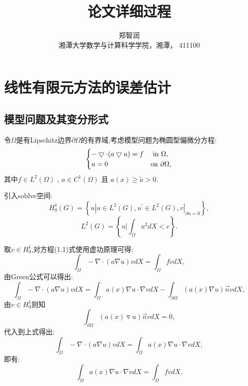 \documentclass[9pt, a4paper,eqno]{article}
\theoremstyle{plain}
\begin{document}
\begin{CJK}{UTF8}{gkai}
\title{\LARGE
论文详细过程 
 }


\author {郑智润  \\
\small{湘潭大学数学与计算科学学院，湘潭， 411100 }  \\
}


\date{}

\maketitle \thispagestyle{empty} \large{
}

\section{线性有限元方法的误差估计}
\subsection{模型问题及其变分形式}
\noindent


令$\Omega$是有Lipschitz边界$\partial\Omega$的有界域,考虑模型问题为椭圆型偏微分方程:
\begin{equation}
\begin{cases}
   -\bigtriangledown \cdot (a\bigtriangledown u)=f     &\mbox{ in $\Omega$, }\\
  u = 0 &\mbox{on $ \partial \Omega $},\\
\end{cases}
\end{equation}
其中$f\in L^{2}(\Omega)$ , $a \in C^{1}(\Omega)$ 且 $a(x) \geq \tilde a > 0.$

引入soblve空间:
$$H_{0}^{1}(G)=\left\lbrace   u|u \in L^{2}(G) , u^{\prime} \in L^{2}(G) , v|_{\partial n = 0} \right\rbrace ,$$
$$L^{2}(G) = \left\lbrace u| \int _{\Omega} u^{2} d X < c \right\rbrace.$$

取$v \in H^{1}_{0} $,对方程(1.1)式使用虚功原理可得:
$$ \int _{\Omega} -\nabla \cdot (a \nabla u) v dX = \int _{\Omega} fv dX,  $$
由Green公式可以得出:
$$\int _{\Omega} -\nabla \cdot (a \nabla u) v dX  = \int _{\Omega} a(x) \nabla u \cdot \nabla v dX - \int _{\partial \Omega} (a(x) \nabla u  )\vec{n} v dX,    $$
由$v \in H_{0}^{1} $则知$$\int _{\partial \Omega} (a(x) \triangledown u ) \vec{n} v dX = 0,$$代入到上式得出:
$$ \int _{\Omega} -\nabla \cdot (a \nabla u) v dX  = \int _{\Omega} a(x) \nabla u \cdot \nabla v dX,$$
即有:$$ \int _{\Omega} a(x) \nabla u \cdot \nabla v dX = \int _{\Omega} fv dX.$$


\end{CJK}
\end{document}
